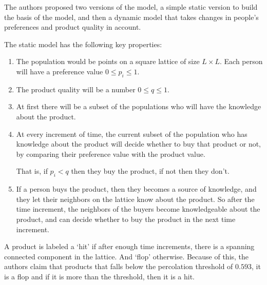 \documentclass[article, 11pt, a4paper]{memoir}
\begin{document}
\begin{enumerate}[left=0pt, itemsep=20pt, label={\(\square\)}]
        The authors proposed two versions of the model, a simple static version to build
        the basis of the model, and then a dynamic model that takes changes in people's
        preferences and product quality in account.

        The static model has the following key properties:
        \begin{enumerate}[left=0pt, itemsep=0pt]
            \item The population would be points on a square lattice of size \(L\times
                L\). Each person will have a preference value \(0 \le p_i\le 1\). 
            \item The product quality will be a number \(0 \le q \le 1\).
            \item At first there will be a subset of the populations who will have the
                knowledge about the product. 
            \item At every increment of time, the current subset of the population who has
                knowledge about the product will decide whether to buy that product or
                not, by comparing their preference value with the product value. 

                That is, if \(p_i<q\) then they buy the product, if not then they don't.
            \item If a person buys the product, then they becomes a source of knowledge,
                and they let their neighbors on the lattice know about the product. So
                after the time increment, the neighbors of the buyers become knowledgeable
                about the product, and can decide whether to buy the product in the next
                time increment.
        \end{enumerate}

        A product is labeled a `hit' if after enough time increments, there is a spanning
        connected component in the lattice. And `flop' otherwise. Because of this, the
        authors claim that products that falls below the percolation threshold of 
        \(0.593\), it is a flop and if it is more than the threshold, then it is a hit.


\end{enumerate}
\end{document}
